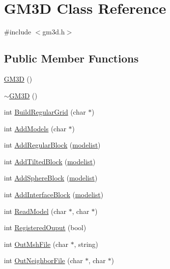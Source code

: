 \hypertarget{class_g_m3_d}{}\section{G\+M3D Class Reference}
\label{class_g_m3_d}


{\ttfamily \#include $<$gm3d.\+h$>$}

\subsection*{Public Member Functions}
\begin{DoxyCompactItemize}
\item 
\mbox{\hyperlink{class_g_m3_d_ae6a32dc834fb39387e33f359b007b388}{G\+M3D}} ()
\item 
\mbox{\hyperlink{class_g_m3_d_ae0054e01b89d111d23d4ca0d8039c19c}{$\sim$\+G\+M3D}} ()
\item 
int \mbox{\hyperlink{class_g_m3_d_a5e8430d633cf08053ee05395e3ae3d12}{Build\+Regular\+Grid}} (char $\ast$)
\item 
int \mbox{\hyperlink{class_g_m3_d_ab398f974da9ae5f066c64457a6eb9f10}{Add\+Models}} (char $\ast$)
\item 
int \mbox{\hyperlink{class_g_m3_d_afc8de602a16eee397f0e890ffe5eea7b}{Add\+Regular\+Block}} (\mbox{\hyperlink{structmodelist}{modelist}})
\item 
int \mbox{\hyperlink{class_g_m3_d_ad83b4f92015b2a58a5a20185250bce0d}{Add\+Tilted\+Block}} (\mbox{\hyperlink{structmodelist}{modelist}})
\item 
int \mbox{\hyperlink{class_g_m3_d_ae1c8d36d2273f73d9744b5d358881691}{Add\+Sphere\+Block}} (\mbox{\hyperlink{structmodelist}{modelist}})
\item 
int \mbox{\hyperlink{class_g_m3_d_a2d90d9301112d0c6d64f6ed862b3bdc1}{Add\+Interface\+Block}} (\mbox{\hyperlink{structmodelist}{modelist}})
\item 
int \mbox{\hyperlink{class_g_m3_d_ac4ae7d42841c34329b0f6759d7b25ed3}{Read\+Model}} (char $\ast$, char $\ast$)
\item 
int \mbox{\hyperlink{class_g_m3_d_a1115ede901171bef65d0287b8fb847d4}{Registered\+Ouput}} (bool)
\item 
int \mbox{\hyperlink{class_g_m3_d_a052c44e6d3db5ca4bd2b644ca95bb3b4}{Out\+Msh\+File}} (char $\ast$, string)
\item 
int \mbox{\hyperlink{class_g_m3_d_ab209045f308eb02fe251f1817a6e1487}{Out\+Neighbor\+File}} (char $\ast$, char $\ast$)
\item 

\end{DoxyCompactItemize}
